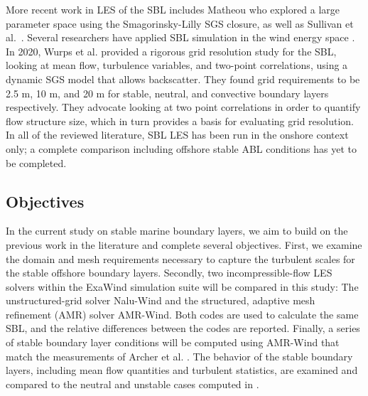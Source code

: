 \documentclass[conf]{new-aiaa}
\begin{document}
More recent work in LES of the SBL includes Matheou \cite{Matheou2016} who
explored a large parameter space using the Smagorinsky-Lilly SGS
closure, as well as Sullivan et al.\ \cite{sullivan2016turbulent}. Several researchers
have applied SBL simulation in the wind energy space \cite{Aitken2014, Abkar2015, Ghaisas2017}.
In 2020, Wurps et al. \cite{Wurps2020} provided a rigorous grid resolution study for the SBL,
looking at mean flow, turbulence variables, and two-point correlations, using a dynamic
SGS model that allows backscatter. They found grid requirements to be 2.5 m, 10 m, and 20 m
for stable, neutral, and convective boundary layers respectively. They advocate looking
at two point correlations in order to quantify flow structure size, which in turn
provides a basis for evaluating grid resolution. In all of the reviewed literature, SBL LES
has been run in the onshore context only; a complete comparison
including offshore stable ABL conditions has yet to be completed.

\subsection{Objectives}
In the current study on stable marine boundary layers, we aim to build
on the previous work in the literature and complete several
objectives.  First, we examine the domain and mesh requirements
necessary to capture the turbulent scales for the stable offshore
boundary layers.  Secondly, two incompressible-flow LES solvers within
the ExaWind simulation suite will be compared in this study: The
unstructured-grid solver Nalu-Wind and the structured, adaptive mesh
refinement (AMR) solver AMR-Wind.  Both codes are used to calculate
the same SBL, and the relative differences between the codes are
reported.  Finally, a series of stable boundary layer conditions will
be computed using AMR-Wind that match the measurements of Archer et
al. \cite{archer2016predominance}.  The behavior of the stable
boundary layers, including mean flow quantities and turbulent
statistics, are examined and compared to the neutral and unstable
cases computed in \cite{cheung2020large}.




\end{document}
